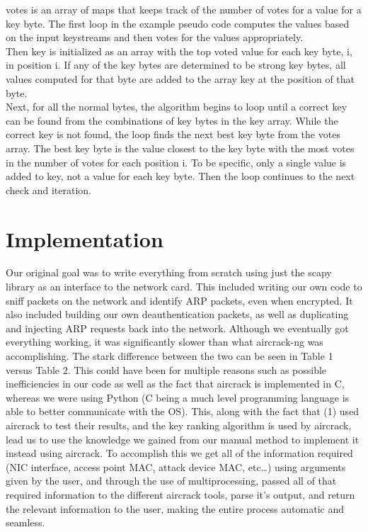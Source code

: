\documentclass[10pt, titlepage]{article}
\begin{document}
votes is an array of maps that keeps track of the number of votes for a value for a key byte. The first loop in the example pseudo code computes the values based on the input keystreams and then votes for the values appropriately. \\

Then key is initialized as an array with the top voted value for each key byte, i, in position i. If any of the key bytes are determined to be strong key bytes, all values computed for that byte are added to the array key at the position of that byte. \\

Next, for all the normal bytes, the algorithm begins to loop until a correct key can be found from the combinations of key bytes in the key array. While the correct key is not found, the loop finds the next best key byte from the votes array. The best key byte is the value closest to the key byte with the most votes in the number of votes for each position i. To be specific, only a single value is added to key, not a value for each key byte. Then the loop continues to the next check and iteration.

\section{Implementation}
Our original goal was to write everything from scratch using just the scapy library as an interface to the network card. This included writing our own code to sniff packets on the network and identify ARP packets, even when encrypted. It also included building our own deauthentication packets, as well as duplicating and injecting ARP requests back into the network. Although we eventually got everything working, it was significantly slower than what aircrack-ng was accomplishing. The stark difference between the two can be seen in Table 1 versus Table 2. This could have been for multiple reasons such as possible inefficiencies in our code as well as the fact that aircrack is implemented in C, whereas we were using Python (C being a much level programming language is able to better communicate with the OS). This, along with the fact that (1) used aircrack to test their results, and the key ranking algorithm is used by aircrack, lead us to use the knowledge we gained from our manual method to implement it instead using aircrack. To accomplish this we get all of the information required (NIC interface, access point MAC, attack device MAC, etc…) using arguments given by the user, and through the use of multiprocessing, passed all of that required information to the different aircrack tools, parse it’s output, and return the relevant information to the user, making the entire process automatic and seamless.\\
\end{document}
